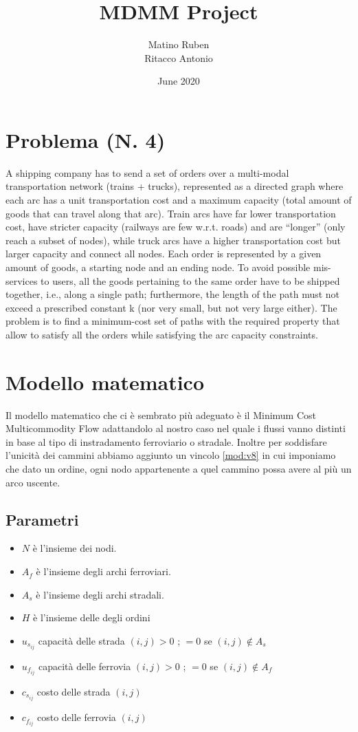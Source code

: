 \documentclass{article}
\title{MDMM Project}
\author{Matino Ruben \\ Ritacco Antonio }
\date{June 2020}
\begin{document}
\maketitle

\section{Problema (N. 4)}

A shipping company has to send a set of orders over a multi-modal transportation network (trains +
trucks), represented as a directed graph where each arc has a unit transportation cost and a
maximum capacity (total amount of goods that can travel along that arc). Train arcs have far lower
transportation cost, have stricter capacity (railways are few w.r.t. roads) and are “longer” (only
reach a subset of nodes), while truck arcs have a higher transportation cost but larger capacity and
connect all nodes. Each order is represented by a given amount of goods, a starting node and an
ending node. To avoid possible mis-services to users, all the goods pertaining to the same order
have to be shipped together, i.e., along a single path; furthermore, the length of the path must not
exceed a prescribed constant k (nor very small, but not very large either). The problem is to find a
minimum-cost set of paths with the required property that allow to satisfy all the orders while
satisfying the arc capacity constraints.


\section{Modello matematico}
Il modello matematico che ci è sembrato più adeguato è il Minimum Cost Multicommodity Flow adattandolo al nostro caso nel quale i flussi vanno distinti in base al tipo di instradamento ferroviario o stradale. Inoltre per soddisfare l'unicità dei cammini abbiamo aggiunto un vincolo \eqref{mod:v8} in cui imponiamo che dato un ordine, ogni nodo appartenente a quel cammino possa avere al più un arco uscente.
\subsection{Parametri}
\begin{itemize}
    \item \textbf{$N$} è l'insieme dei nodi.
    \item \textbf{$A_f$} è l'insieme degli archi ferroviari.
    \item \textbf{$A_s$} è l'insieme degli archi stradali.
    \item \textbf{$H$} è l'insieme delle degli ordini
    \item $u_{s_{ij}}$ capacità delle strada $(i,j) > 0$ ; $=0$ se $(i,j) \not\in A_s $ 
    \item $u_{f_{ij}}$ capacità delle ferrovia $(i,j) > 0$ ; $=0$ se $(i,j) \not\in A_f $ 
    \item $c_{s_{ij}}$ costo delle strada $(i,j)$
    \item $c_{f_{ij}}$ costo delle ferrovia $(i,j)$
\end{itemize}
\end{document}
